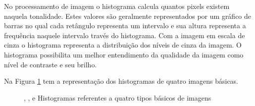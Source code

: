 No processamento de imagem o histograma calcula quantos pixels existem naquela tonalidade. Estes valores são geralmente representados por um gráfico de barras no qual cada retângulo representa um intervalo e sua altura representa a frequência naquele intervalo través do histograma.
Com a imagem em escala de cinza o histograma representa a distribuição dos níveis de cinza da imagem. O histograma possibilita um melhor entendimento da qualidade da imagem como nível de contraste e seu brilho. \cite{ImgDigital2001}

Na Figura \ref{subfig:histograma} tem a representação dos histogramas de quatro imagens básicas.
\begin{figure}[h]
 \centering
   \qquad
     \qquad
    \qquad
   \caption{{} , {}, {} e {} Histogramas referentes a quatro tipos básicos de imagens \cite{digitalImgProcess2010} }
  \label{subfig:histograma}
\end{figure}


